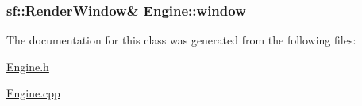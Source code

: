 \subsubsection[{window}]{\setlength{\rightskip}{0pt plus 5cm}sf\+::\+Render\+Window\& Engine\+::window\hspace{0.3cm}{\ttfamily [protected]}}\label{class_engine_ae5fb055a0acce41034a9bff218dd87b1}


The documentation for this class was generated from the following files\+:\begin{DoxyCompactItemize}
\item 
\hyperlink{_engine_8h}{Engine.\+h}\item 
\hyperlink{_engine_8cpp}{Engine.\+cpp}\end{DoxyCompactItemize}
